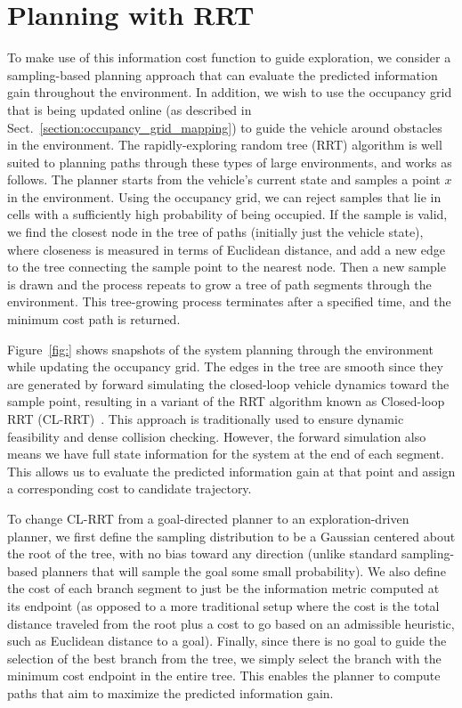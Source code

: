 \section{Planning with RRT}
\label{sec:planner}

To make use of this information cost function to guide exploration, we consider a sampling-based planning approach that can evaluate the predicted information gain throughout the environment. In addition, we wish to use the occupancy grid that is being updated online (as described in Sect.~\ref{section:occupancy_grid_mapping}) to guide the vehicle around obstacles in the environment. The rapidly-exploring random tree (RRT) algorithm is well suited to planning paths through these types of large environments, and works as follows.
The planner starts from the vehicle's current state and samples a point $x$ in the environment. Using the occupancy grid, we can reject samples that lie in cells with a sufficiently high probability of being occupied. If the sample is valid, we find the closest node in the tree of paths (initially just the vehicle state), where closeness is measured in terms of Euclidean distance, and add a new edge to the tree connecting the sample point to the nearest node.
Then a new sample is drawn and the process repeats to grow a tree of path segments through the environment. This tree-growing process terminates after a specified time, and the minimum cost path is returned.

Figure~\ref{fig:} shows snapshots of the system planning through the environment while updating the occupancy grid. The edges in the tree are smooth since they are generated by forward simulating the closed-loop vehicle dynamics toward the sample point, resulting in a variant of the RRT algorithm known as Closed-loop RRT (CL-RRT)~\cite{Kuwata09_TCST}. This approach is traditionally used to ensure dynamic feasibility and dense collision checking. However, the forward simulation also means we have full state information for the system at the end of each segment. This allows us to evaluate the predicted information gain at that point and assign a corresponding cost to candidate trajectory.

To change CL-RRT from a goal-directed planner to an exploration-driven planner, we first define the sampling distribution to be a Gaussian centered about the root of the tree, with no bias toward any direction (unlike standard sampling-based planners that will sample the goal some small probability). We also define the cost of each branch segment to just be the information metric computed at its endpoint (as opposed to a more traditional setup where the cost is the total distance traveled from the root plus a cost to go based on an admissible heuristic, such as Euclidean distance to a goal). Finally, since there is no goal to guide the selection of the best branch from the tree, we simply select the branch with the minimum cost endpoint in the entire tree. This enables the planner to compute paths that aim to maximize the predicted information gain.

